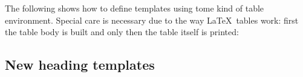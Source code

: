 \documentclass{acro-manual}
\begin{document}
The following shows how to define templates using tome kind of table
environment.  Special care is necessary due to the way \LaTeX\ tables work:
first the table body is built and only then the table itself is printed:
\begin{sourcecode}
\end{sourcecode}

\begin{sourcecode}
\end{sourcecode}

\subsection{New heading templates}\label{sec:new-head-templ}
\end{document}
